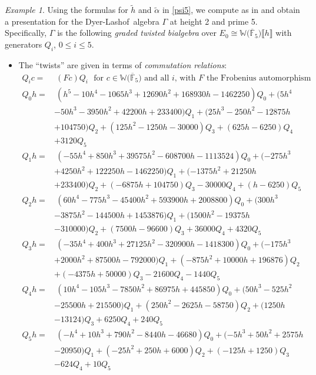 \documentclass{gtpart}
\theoremstyle{definition}
\theoremstyle{remark}
\newtheorem{ex}[thm]{Example}
\newcommand{\mb}[1]{\mathbb{#1}}
\newcommand{\cF}{\overline {\mb F}}
\newcommand{\DL}{Dyer-Lashof~}
\newcommand{\BW}{{\mb W}}
\newcommand{\A}{\alpha}
\newcommand{\G}{\Gamma}
\newcommand{\lb}{\llbracket}
\newcommand{\rb}{\rrbracket}
\renewcommand{\=}{\approx}
\renewcommand{\-}{\sim}
\numberwithin{equation}{section}
\numberwithin{thm}{section}
\begin{document}
\begin{ex}
 \label{ex:gamma}
 Using the formulas for $\widetilde{h}$ and $\widetilde{\A}$ in \eqref{psi5}, 
 we compute as in \cite[Proposition 3.6]{p3} and obtain a presentation for the \DL algebra $\G$ at height 2 and prime 5.  
 Specifically, $\G$ is the following {\em graded twisted bialgebra} 
 over $E_0 \cong \BW \big( \cF_5 \big) \lb h \rb$ with generators $Q_i$, $0 \leq i \leq 5$.  

 \begin{itemize}
  \item The ``twists'' are given in terms of {\em commutation relations}: 
  \begin{equation*}
   \begin{split}
    Q_i c = & ~ (F c) Q_i ~~~ \text{for $c \in \BW \big( \cF_5 \big)$ and all $i$, with $F$ the Frobenius automorphism} \\
    Q_0 h = & ~ (h^5-10 h^4-1065 h^3+12690 h^2+168930 h-1462250) Q_0+(5 h^4 \\
            & -50 h^3-3950 h^2 +42200 h+233400) Q_1+(25 h^3-250 h^2-12875 h \\
            & +104750) Q_2+(125 h^2-1250 h -30000) Q_3+(625 h-6250) Q_4 \\
            & +3120 Q_5 \\
    Q_1 h = & ~ (-55 h^4+850 h^3+39575 h^2-608700 h-1113524) Q_0+(-275 h^3 \\
            & +4250 h^2+122250 h -1462250) Q_1+(-1375 h^2+21250 h \\
            & +233400) Q_2+(-6875 h+104750) Q_3-30000 Q_4 +(h-6250) Q_5 \\
    Q_2 h = & ~ (60 h^4-775 h^3-45400 h^2+593900 h+2008800) Q_0+(300 h^3 \\
            & -3875 h^2-144500 h +1453876) Q_1+(1500 h^2-19375 h \\
            & -310000) Q_2+(7500 h-96600) Q_3+36000 Q_4 +4320 Q_5 \\
    Q_3 h = & ~ (-35 h^4+400 h^3+27125 h^2-320900 h-1418300) Q_0+(-175 h^3 \\
            & +2000 h^2+87500 h -792000) Q_1+(-875 h^2+10000 h+196876) Q_2 \\
            & +(-4375 h+50000) Q_3-21600 Q_4 -1440 Q_5 \\
    Q_4 h = & ~ (10 h^4-105 h^3-7850 h^2+86975 h+445850) Q_0+(50 h^3-525 h^2 \\
            & -25500 h +215500) Q_1+(250 h^2-2625 h-58750) Q_2+(1250 h \\
            & -13124) Q_3+6250 Q_4+240 Q_5 \\
    Q_5 h = & ~ (-h^4+10 h^3+790 h^2-8440 h-46680) Q_0+(-5 h^3+50 h^2+2575 h \\
            & -20950) Q_1 +(-25 h^2+250 h+6000) Q_2+(-125 h+1250) Q_3 \\
            & -624 Q_4+10 Q_5 
   \end{split}
  \end{equation*}


\end{itemize}
\end{ex}
\end{document}

